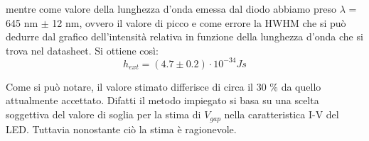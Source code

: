 \documentclass[journal, a4paper]{IEEEtran}
\begin{document}
mentre come valore della lunghezza d'onda emessa dal diodo abbiamo preso $\lambda$ = 645 nm $\pm$ 12 nm, ovvero il valore di picco e come errore la HWHM che si può dedurre dal grafico dell'intensità relativa in funzione della lunghezza d'onda che si trova nel datasheet. Si ottiene così:
\begin{equation}
h_{ext} = (4.7 \pm 0.2) \cdot 10^{-34} Js
\end{equation}

Come si può notare, il valore stimato differisce di circa il 30 $\%$ da quello attualmente accettato. Difatti il metodo impiegato si basa su una scelta soggettiva del valore di soglia per la stima di $V_{gap}$ nella caratteristica I-V del LED. Tuttavia nonostante ciò la stima è ragionevole.
\end{document}
